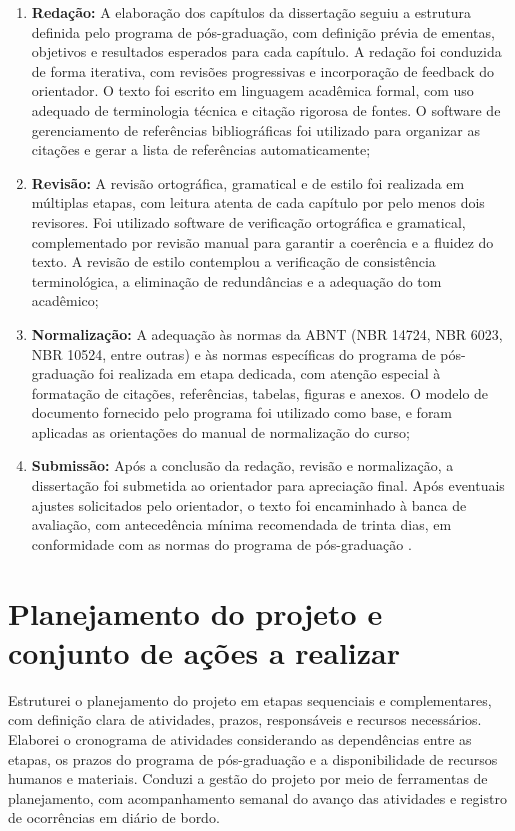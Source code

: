 \begin{enumerate}
    \item \textbf{Redação:} A elaboração dos capítulos da dissertação seguiu a estrutura definida pelo programa de pós-graduação, com definição prévia de ementas, objetivos e resultados esperados para cada capítulo. A redação foi conduzida de forma iterativa, com revisões progressivas e incorporação de feedback do orientador. O texto foi escrito em linguagem acadêmica formal, com uso adequado de terminologia técnica e citação rigorosa de fontes. O software de gerenciamento de referências bibliográficas foi utilizado para organizar as citações e gerar a lista de referências automaticamente;
    \item \textbf{Revisão:} A revisão ortográfica, gramatical e de estilo foi realizada em múltiplas etapas, com leitura atenta de cada capítulo por pelo menos dois revisores. Foi utilizado software de verificação ortográfica e gramatical, complementado por revisão manual para garantir a coerência e a fluidez do texto. A revisão de estilo contemplou a verificação de consistência terminológica, a eliminação de redundâncias e a adequação do tom acadêmico;
    \item \textbf{Normalização:} A adequação às normas da ABNT (NBR 14724, NBR 6023, NBR 10524, entre outras) e às normas específicas do programa de pós-graduação foi realizada em etapa dedicada, com atenção especial à formatação de citações, referências, tabelas, figuras e anexos. O modelo de documento fornecido pelo programa foi utilizado como base, e foram aplicadas as orientações do manual de normalização do curso;
    \item \textbf{Submissão:} Após a conclusão da redação, revisão e normalização, a dissertação foi submetida ao orientador para apreciação final. Após eventuais ajustes solicitados pelo orientador, o texto foi encaminhado à banca de avaliação, com antecedência mínima recomendada de trinta dias, em conformidade com as normas do programa de pós-graduação \cite{SANTOS2024}.
\end{enumerate}

\section{Planejamento do projeto e conjunto de ações a realizar}
\label{sec:planejamento_acoes}

Estruturei o planejamento do projeto em etapas sequenciais e complementares, com definição clara de atividades, prazos, responsáveis e recursos necessários. Elaborei o cronograma de atividades considerando as dependências entre as etapas, os prazos do programa de pós-graduação e a disponibilidade de recursos humanos e materiais. Conduzi a gestão do projeto por meio de ferramentas de planejamento, com acompanhamento semanal do avanço das atividades e registro de ocorrências em diário de bordo.

